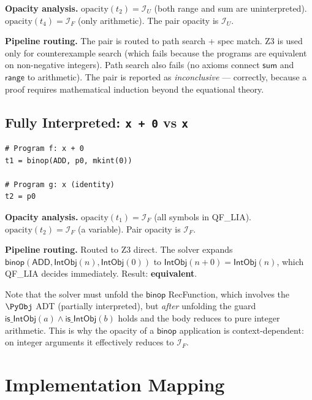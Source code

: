 \textbf{Opacity analysis.}
$\mathrm{opacity}(t_2) = \mathcal{I}_U$
(both \textsf{range} and \textsf{sum} are uninterpreted).
$\mathrm{opacity}(t_4) = \mathcal{I}_F$
(only arithmetic).
The pair opacity is $\mathcal{I}_U$.

\textbf{Pipeline routing.}
The pair is routed to path search + spec match.
Z3 is used only for counterexample search (which fails because
the programs are equivalent on non-negative integers).
Path search also fails (no axioms connect $\mathsf{sum}$ and
$\mathsf{range}$ to arithmetic).  The pair is reported as
\emph{inconclusive} --- correctly, because a proof requires
mathematical induction beyond the equational theory.

\subsection{Fully Interpreted: \texttt{x + 0} vs \texttt{x}}

\begin{lstlisting}[caption={Fully interpreted}]
# Program f: x + 0
t1 = binop(ADD, p0, mkint(0))

# Program g: x (identity)
t2 = p0
\end{lstlisting}

\textbf{Opacity analysis.}
$\mathrm{opacity}(t_1) = \mathcal{I}_F$ (all symbols in QF\_LIA).
$\mathrm{opacity}(t_2) = \mathcal{I}_F$ (a variable).
Pair opacity is $\mathcal{I}_F$.

\textbf{Pipeline routing.}
Routed to Z3 direct.  The solver expands
$\mathsf{binop}(\mathsf{ADD}, \mathsf{IntObj}(n),
\mathsf{IntObj}(0))$ to $\mathsf{IntObj}(n + 0) = \mathsf{IntObj}(n)$,
which QF\_LIA decides immediately.
Result: \textbf{equivalent}.

Note that the solver must unfold the $\mathsf{binop}$ RecFunction,
which involves the $\PyObj$ ADT (partially interpreted), but
\emph{after} unfolding the guard $\mathsf{is\_IntObj}(a) \land
\mathsf{is\_IntObj}(b)$ holds and the body reduces to pure
integer arithmetic.  This is why the opacity of a $\mathsf{binop}$
application is context-dependent: on integer arguments it
effectively reduces to $\mathcal{I}_F$.


\section{Implementation Mapping}
\label{sec:opacity-impl}

